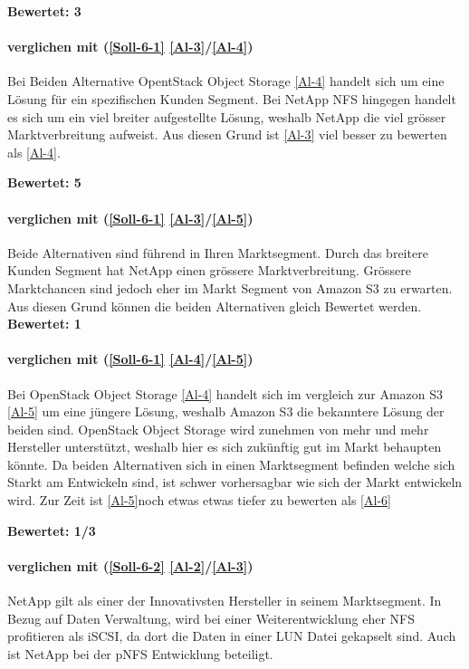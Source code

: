 \textbf{Bewertet: 3}

\paragraph*{  verglichen mit  (\ref{Soll-6-1} \ref{Al-3}/\ref{Al-4})}
Bei Beiden Alternative OpentStack Object Storage \ref{Al-4} handelt sich um eine Lösung für ein spezifischen Kunden Segment. Bei NetApp NFS hingegen handelt es sich um ein viel breiter aufgestellte Lösung, weshalb NetApp die viel grösser Marktverbreitung aufweist. Aus diesen Grund ist  \ref{Al-3} viel besser zu bewerten als  \ref{Al-4}.

\textbf{Bewertet: 5}

\paragraph*{  verglichen mit  (\ref{Soll-6-1} \ref{Al-3}/\ref{Al-5})}
Beide Alternativen sind führend in Ihren Marktsegment. Durch das breitere Kunden Segment hat NetApp einen grössere Marktverbreitung. Grössere Marktchancen sind jedoch eher im Markt Segment von Amazon S3 zu erwarten. Aus diesen Grund können die beiden Alternativen gleich Bewertet werden.
\textbf{Bewertet: 1}


\paragraph*{  verglichen mit  (\ref{Soll-6-1} \ref{Al-4}/\ref{Al-5})}
Bei OpenStack Object Storage \ref{Al-4} handelt sich im vergleich zur Amazon S3 \ref{Al-5} um eine jüngere Lösung, weshalb Amazon S3 die bekanntere Lösung der beiden sind. OpenStack Object Storage wird zunehmen von mehr und mehr Hersteller unterstützt, weshalb hier es sich zukünftig gut im Markt behaupten könnte. Da beiden Alternativen sich in einen Marktsegment befinden welche sich Starkt am Entwickeln sind, ist schwer vorhersagbar wie sich der Markt entwickeln wird. Zur Zeit ist \ref{Al-5}noch etwas etwas tiefer zu bewerten als \ref{Al-6}

\textbf{Bewertet: 1/3}


\paragraph*{  verglichen mit  (\ref{Soll-6-2} \ref{Al-2}/\ref{Al-3})}
NetApp gilt als einer der Innovativsten Hersteller in seinem Marktsegment. In Bezug auf Daten Verwaltung, wird bei einer Weiterentwicklung eher NFS profitieren als iSCSI, da dort die Daten in einer LUN Datei gekapselt sind. Auch ist NetApp bei der pNFS Entwicklung beteiligt.

